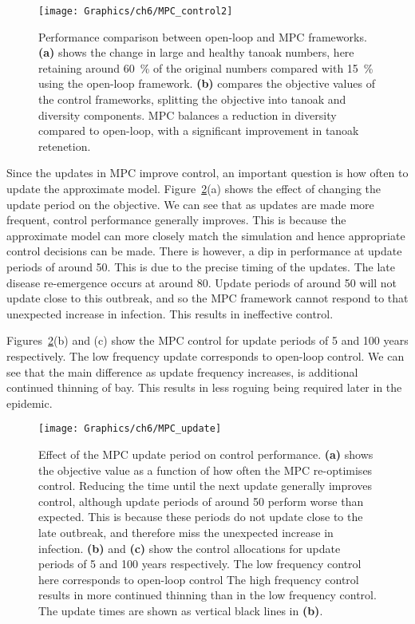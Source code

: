 \begin{figure}[t]
    \begin{center}
        \texttt{[image: Graphics/ch6/MPC\_control2]}
        \caption[MPC strategy performance]{Performance comparison between open-loop and MPC frameworks. \textbf{(a)} shows the change in large and healthy tanoak numbers, here retaining around \SI{60}{\percent} of the original numbers compared with \SI{15}{\percent} using the open-loop framework. \textbf{(b)} compares the objective values of the control frameworks, splitting the objective into tanoak and diversity components. MPC balances a reduction in diversity compared to open-loop, with a significant improvement in tanoak retenetion.\label{fig:ch6:mpc_performance}}
    \end{center}
\end{figure}

Since the updates in MPC improve control, an important question is how often to update the approximate model. Figure~\ref{fig:ch6:mpc_update}(a) shows the effect of changing the update period on the objective. We can see that as updates are made more frequent, control performance generally improves. This is because the approximate model can more closely match the simulation and hence appropriate control decisions can be made. There is however, a dip in performance at update periods of around \SI{50}{\years}. This is due to the precise timing of the updates. The late disease re-emergence occurs at around \SI{80}{\years}. Update periods of around \SI{50}{\years} will not update close to this outbreak, and so the MPC framework cannot respond to that unexpected increase in infection. This results in ineffective control.

Figures~\ref{fig:ch6:mpc_update}(b) and (c) show the MPC control for update periods of 5 and 100 years respectively. The low frequency update corresponds to open-loop control. We can see that the main difference as update frequency increases, is additional continued thinning of bay. This results in less roguing being required later in the epidemic.

\begin{figure}
    \begin{center}
        \texttt{[image: Graphics/ch6/MPC\_update]}
        \caption[Effect of MPC update period]{Effect of the MPC update period on control performance. \textbf{(a)} shows the objective value as a function of how often the MPC re-optimises control. Reducing the time until the next update generally improves control, although update periods of around \SI{50}{\years} perform worse than expected. This is because these periods do not update close to the late outbreak, and therefore miss the unexpected increase in infection. \textbf{(b)} and \textbf{(c)} show the control allocations for update periods of 5 and 100 years respectively. The low frequency control here corresponds to open-loop control The high frequency control results in more continued thinning than in the low frequency control. The update times are shown as vertical black lines in \textbf{(b)}.\label{fig:ch6:mpc_update}}
    \end{center}
\end{figure}

